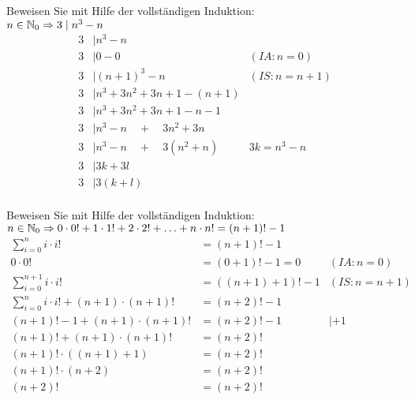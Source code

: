 \begin{card}
  Beweisen Sie mit Hilfe der vollständigen Induktion:\\
  $n \in \mathbb{N}_0 \Rightarrow 3 \mid n^3 - n$
  \hr
  \begin{align*}
    3 &\mid n^3 - n & \\
    3 &\mid 0 - 0 & (IA: n=0) \\
    3 &\mid (n+1)^3 - n & (IS: n=n+1) \\
    3 &\mid n^3 + 3n^2 + 3n + 1 - (n+1) & \\
    3 &\mid n^3 + 3n^2 + 3n + 1 - n - 1 & \\
    3 &\mid n^3 - n \quad + \quad 3n^2 + 3n & \\
    3 &\mid n^3 - n \quad + \quad 3(n^2 + n) & 3k = n^3 - n \\
    3 &\mid 3k + 3l & \\
    3 &\mid 3(k + l) & \\
  \end{align*}
\end{card}

\begin{card}
  Beweisen Sie mit Hilfe der vollständigen Induktion:\\
  $n \in \mathbb{N}_0 \Rightarrow 0 \cdot 0! + 1 \cdot 1! + 2 \cdot 2! + \ldots + n \cdot n! = (n+1)!-1$
  \hr
  \begin{align*}
    \sum\limits_{i=0}^{n} i \cdot i! &= (n+1)!-1 & \\
    0 \cdot 0! &= (0+1)!-1 = 0 & (IA: n=0) \\
    \sum\limits_{i=0}^{n+1} i \cdot i! &= ((n+1)+1)!-1 & (IS: n=n+1) \\
    \sum\limits_{i=0}^{n} i \cdot i! + (n+1) \cdot (n+1)! &= (n+2)!-1 & \\
    (n+1)! - 1 + (n+1) \cdot (n+1)! &= (n+2)!-1 & |+1 \\
    (n+1)! + (n+1) \cdot (n+1)! &= (n+2)! & \\
    (n+1)! \cdot ((n+1)+1) &= (n+2)! & \\
    (n+1)! \cdot (n+2) &= (n+2)! & \\
    (n+2)! &= (n+2)! & \\
  \end{align*}
\end{card}

